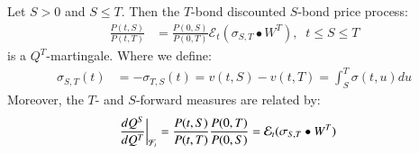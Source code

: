 \begin{lemma}
\label{lemma: T-discounted-S-discounted-bond}
Let $S>0$ and $S\leq T$. Then the $T$-bond discounted $S$-bond price process:
\begin{align*}
\frac{P(t,S)}{P(t,T)}
&= 
\frac{P(0,S)}{P(0,T)}\mathcal{E}_{t}(\sigma_{S,T}\bullet W^{T}), \;\;t\leq S\leq T
\end{align*}
is a $Q^{T}$-martingale. Where we define: 
\begin{align*}
\sigma_{S,T}(t) &= - \sigma_{T,S}(t) = v(t,S) - v(t,T) = \int_{S}^{T}\sigma(t,u)du    
\end{align*}
Moreover, the $T$- and $S$-forward measures are related by: 
\begin{align*}
\frac{dQ^{S}}{dQ^{T}}\bigg{|}_{\mathcal{F}_{t}}
&= 
\frac{P(t,S)}{P(t,T)}\frac{P(0,T)}{P(0,S)} = \mathcal{E}_{t}(\sigma_{S,T}\bullet W^{T})
\end{align*}
\end{lemma}

